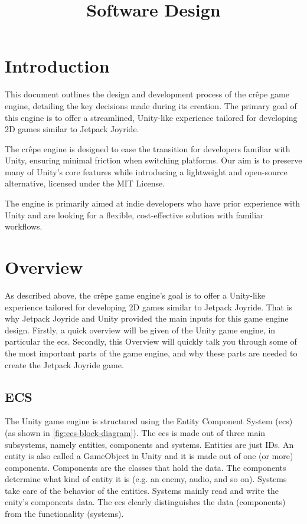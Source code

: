 \documentclass{projdoc}
\title{Software Design}
\begin{document}
\tablestables
\newpage

\section{Introduction}

This document outlines the design and development process of the cr\^epe game engine,
detailing the key decisions made during its creation. The primary goal of this engine
is to offer a streamlined, Unity-like experience tailored for developing 2D games
similar to Jetpack Joyride.

The cr\^epe engine is designed to ease the transition for developers familiar with
Unity, ensuring minimal friction when switching platforms. Our aim is to preserve
many of Unity’s core features while introducing a lightweight and open-source
alternative, licensed under the MIT License.

The engine is primarily aimed at indie developers who have prior experience with
Unity and are looking for a flexible, cost-effective solution with familiar
workflows.

\section{Overview}

As described above, the cr\^epe game engine's goal is to offer a Unity-like
experience tailored for developing 2D games similar to Jetpack Joyride. That is why
Jetpack Joyride and Unity provided the main inputs for this game engine design.
Firstly, a quick overview will be given of the Unity game engine, in particular the
\gls{ecs}. Secondly, this Overview will quickly talk you through some of the most
important parts of the game engine, and why these parts are needed to create the
Jetpack Joyride game.

\subsection{ECS}

The Unity game engine is structured using the Entity Component System (\gls{ecs}) (as
shown in \cref{fig:ecs-block-diagram}). The \gls{ecs} is made out of three main
subsystems, namely entities, components and systems. Entities are just IDs. An entity
is also called a GameObject in Unity and it is made out of one (or more) components.
Components are the classes that hold the data. The components determine what kind of
entity it is (e.g. an enemy, audio, and so on). Systems take care of the behavior of
the entities. Systems mainly read and write the enity's components data. The
\gls{ecs} clearly distinguishes the data (components) from the functionality
(systems).
\end{document}
